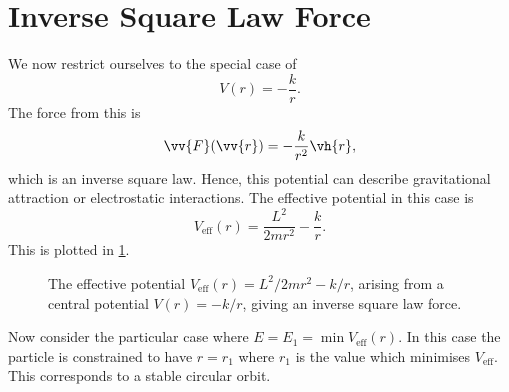 \documentclass[fleqn]{NotesClass}
\newcommand*{\eff}{\mathrm{eff}}
\begin{document}
    \section{Inverse Square Law Force}
    We now restrict ourselves to the special case of
    \begin{equation}
        V(r) = -\frac{k}{r}.
    \end{equation}
    The force from this is
    \begin{equation}
        \vv{F}(\vv{r}) = -\frac{k}{r^2}\vh{r},
    \end{equation}
    which is an inverse square law.
    Hence, this potential can describe gravitational attraction or electrostatic interactions.
    The effective potential in this case is
    \begin{equation}
        V_\eff(r) = \frac{L^2}{2mr^2} - \frac{k}{r}.
    \end{equation}
    This is plotted in \cref{fig:effective central potential}.
    
    \begin{figure}
        \caption[The effective potential.]{The effective potential \(V_{\eff}(r) = L^2/2mr^2 - k/r\), arising from a central potential \(V(r) = -k/r\), giving an inverse square law force.}
        \label{fig:effective central potential}
    \end{figure}
    
    Now consider the particular case where \(E = E_1 = \min V_{\eff}(r)\).
    In this case the particle is constrained to have \(r = r_1\) where \(r_1\) is the value which minimises \(V_\eff\).
    This corresponds to a stable circular orbit.
    
\end{document}
